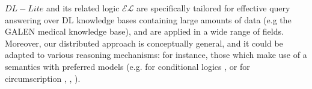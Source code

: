 \documentclass[a4paper, 11pt, oneside]{duthesis}
\begin{document}
$DL-Lite$ and its related logic $\mathcal{EL}$ are specifically tailored for effective query answering over DL knowledge bases containing large amounts of data (e.g the GALEN medical knowledge base), and are applied in a wide range of fields.\\

Moreover, our distributed approach is conceptually general, and it could be adapted to various reasoning mechanisms: for instance, those which make use of a semantics with preferred models (e.g. for conditional logics \cite{jelia2012nmr}, or for circumscription \cite{hitzlertableau}, \cite{Voorbraak:1991:PMS:646559.695082}, \cite{Sengupta:2011:LCW:2063016.2063056}).




\newpage



\end{document}
